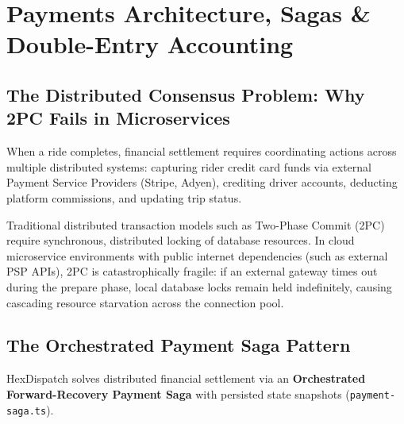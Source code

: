 \documentclass[11pt,a4paper]{article}
\begin{document}
\section{Payments Architecture, Sagas \& Double-Entry Accounting}

\subsection{The Distributed Consensus Problem: Why 2PC Fails in Microservices}
When a ride completes, financial settlement requires coordinating actions across multiple distributed systems: capturing rider credit card funds via external Payment Service Providers (Stripe, Adyen), crediting driver accounts, deducting platform commissions, and updating trip status.

Traditional distributed transaction models such as Two-Phase Commit (2PC) require synchronous, distributed locking of database resources. In cloud microservice environments with public internet dependencies (such as external PSP APIs), 2PC is catastrophically fragile: if an external gateway times out during the prepare phase, local database locks remain held indefinitely, causing cascading resource starvation across the connection pool.

\subsection{The Orchestrated Payment Saga Pattern}
HexDispatch solves distributed financial settlement via an \textbf{Orchestrated Forward-Recovery Payment Saga} with persisted state snapshots (\texttt{payment-saga.ts}).
\end{document}
